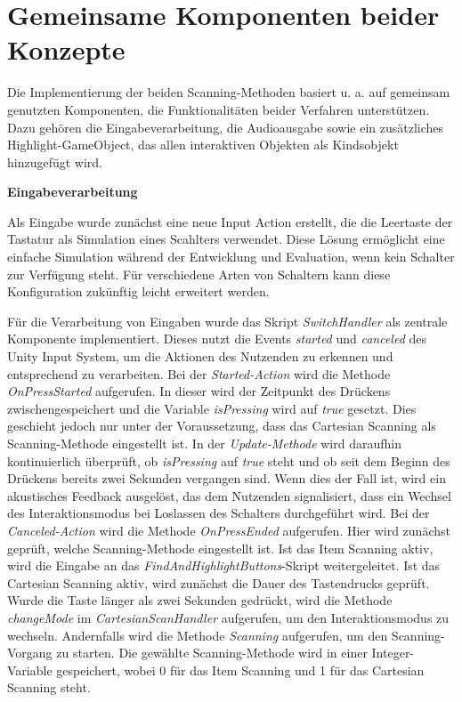 \section {Gemeinsame Komponenten beider Konzepte}

Die Implementierung der beiden Scanning-Methoden basiert u. a. auf gemeinsam genutzten Komponenten, die Funktionalitäten beider Verfahren unterstützen. Dazu gehören die Eingabeverarbeitung, die Audioausgabe sowie ein zusätzliches Highlight-GameObject, das allen interaktiven Objekten als Kindsobjekt hinzugefügt wird. 

{\normalfont \bfseries Eingabeverarbeitung}

Als Eingabe wurde zunächst eine neue Input Action erstellt, die die Leertaste der Tastatur als Simulation eines Scahlters verwendet. Diese Lösung ermöglicht eine einfache Simulation während der Entwicklung und Evaluation, wenn kein Schalter zur Verfügung steht. Für verschiedene Arten von Schaltern kann diese Konfiguration zukünftig leicht erweitert werden.

Für die Verarbeitung von Eingaben wurde das Skript \textit{SwitchHandler} als zentrale Komponente implementiert. Dieses nutzt die Events \textit{started} und \textit{canceled} des Unity Input System, um die Aktionen des Nutzenden zu erkennen und entsprechend zu verarbeiten. Bei der \textit{Started-Action} wird die Methode \textit{OnPressStarted} aufgerufen. In dieser wird der Zeitpunkt des Drückens zwischengespeichert und die Variable \textit{isPressing} wird auf \textit{true} gesetzt. Dies geschieht jedoch nur unter der Voraussetzung, dass das Cartesian Scanning als Scanning-Methode eingestellt ist. In der \textit{Update-Methode} wird daraufhin kontinuierlich überprüft, ob \textit{isPressing} auf \textit{true} steht und ob seit dem Beginn des Drückens bereits zwei Sekunden vergangen sind. Wenn dies der Fall ist, wird ein akustisches Feedback ausgelöst, das dem Nutzenden signalisiert, dass ein Wechsel des Interaktionsmodus bei Loslassen des Schalters durchgeführt wird.
Bei der \textit{Canceled-Action} wird die Methode \textit{OnPressEnded} aufgerufen. Hier wird zunächst geprüft, welche Scanning-Methode eingestellt ist. Ist das Item Scanning aktiv, wird die Eingabe an das \textit{FindAndHighlightButtons}-Skript weitergeleitet. Ist das Cartesian Scanning aktiv, wird zunächst die Dauer des Tastendrucks geprüft. Wurde die Taste länger als zwei Sekunden gedrückt, wird die Methode \textit{changeMode} im \textit{CartesianScanHandler} aufgerufen, um den Interaktionsmodus zu wechseln. Andernfalls wird die Methode \textit{Scanning} aufgerufen, um den Scanning-Vorgang zu starten. Die gewählte Scanning-Methode wird in einer Integer-Variable gespeichert, wobei 0 für das Item Scanning und 1 für das Cartesian Scanning steht. 

